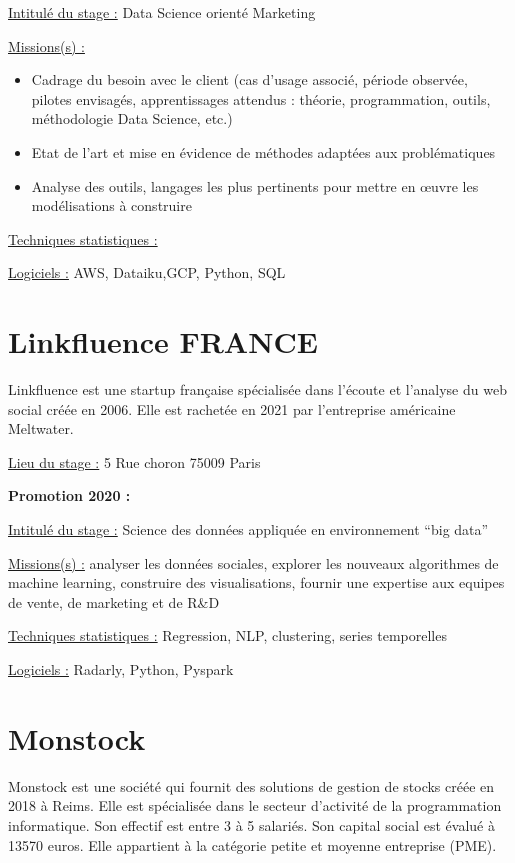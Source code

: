 \documentclass[
  letterpaper,
  DIV=11,
  numbers=noendperiod]{scrreprt}
\begin{document}
\uline{Intitulé du stage :} Data Science orienté Marketing

\uline{Missions(s) :}

\begin{itemize}
\item
  Cadrage du besoin avec le client (cas d'usage associé, période
  observée, pilotes envisagés, apprentissages attendus : théorie,
  programmation, outils, méthodologie Data Science, etc.)
\item
  Etat de l'art et mise en évidence de méthodes adaptées aux
  problématiques
\item
  Analyse des outils, langages les plus pertinents pour mettre en œuvre
  les modélisations à construire
\end{itemize}

\uline{Techniques statistiques :}

\uline{Logiciels :} AWS, Dataiku,GCP, Python, SQL

\hypertarget{linkfluence-france}{%
\section{\texorpdfstring{\textbf{Linkfluence
FRANCE}}{Linkfluence FRANCE}}\label{linkfluence-france}}

Linkfluence est une startup française spécialisée dans l'écoute et
l'analyse du web social créée en 2006. Elle est rachetée en 2021 par
l'entreprise américaine Meltwater.

\uline{Lieu du stage :} 5 Rue choron 75009 Paris

\textbf{Promotion 2020 :}

\uline{Intitulé du stage :} Science des données appliquée en
environnement ``big data''

\uline{Missions(s) :} analyser les données sociales, explorer les
nouveaux algorithmes de machine learning, construire des visualisations,
fournir une expertise aux equipes de vente, de marketing et de R\&D

\uline{Techniques statistiques :} Regression, NLP, clustering, series
temporelles

\uline{Logiciels :} Radarly, Python, Pyspark

\hypertarget{monstock}{%
\section{\texorpdfstring{\textbf{Monstock}}{Monstock}}\label{monstock}}

Monstock est une société qui fournit des solutions de gestion de stocks
créée en 2018 à Reims. Elle est spécialisée dans le secteur d'activité
de la programmation informatique. Son effectif est entre 3 à 5 salariés.
Son capital social est évalué à 13570 euros. Elle appartient à la
catégorie petite et moyenne entreprise (PME).
\end{document}
